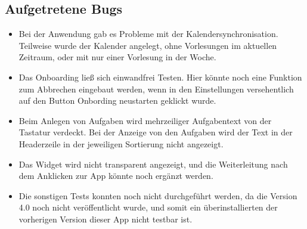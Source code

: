 \subsection{Aufgetretene Bugs}
\begin{itemize}
\item Bei der Anwendung gab es Probleme mit der Kalendersynchronisation. Teilweise wurde der Kalender angelegt, ohne Vorlesungen im aktuellen Zeitraum, oder mit nur einer Vorlesung in der Woche.
\item Das Onboarding ließ sich einwandfrei Testen. Hier könnte noch eine Funktion zum Abbrechen eingebaut werden, wenn in den Einstellungen versehentlich auf den Button Onbording neustarten geklickt wurde.
\item Beim Anlegen von Aufgaben wird mehrzeiliger Aufgabentext von der Tastatur verdeckt. Bei der Anzeige von den Aufgaben wird der Text in der Headerzeile in der jeweiligen Sortierung nicht angezeigt.
\item Das Widget wird nicht transparent angezeigt, und die Weiterleitung nach dem Anklicken zur App könnte noch ergänzt werden.
\item Die sonstigen Tests konnten noch nicht durchgeführt werden, da die Version 4.0 noch nicht veröffentlicht wurde, und somit ein überinstallierten der vorherigen Version dieser App nicht testbar ist.
\end{itemize}

